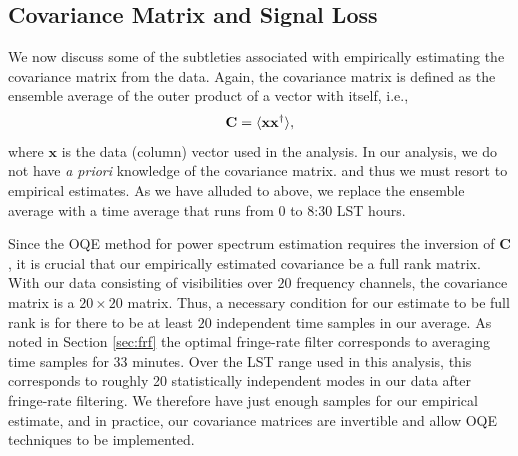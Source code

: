 \documentclass[twocolumn,numberedappendix]{emulateapj} \shorttitle{New Limits on the 21 cm Power Spectrum at $z=8.4$}
\newcommand{\x}{\mathbf{x}} \newcommand{\xhat}{\hat{\mathbf{x}}}
\newcommand{\C}{\mathbf{C}} \newcommand{\Q}{\mathbf{Q}}
\begin{document}
\subsection{Covariance Matrix and Signal Loss}
\label{sec:sigloss}
%

We now discuss some of the subtleties associated with empirically estimating the covariance matrix from
the data. Again, the covariance matrix is defined as the ensemble average of the outer
product of a vector with itself, i.e., 
\begin{equation}
    \C = \expval{\x\x^{\dagger}}, 
\end{equation}
where $\x$ is the data (column) vector used in the analysis. In our analysis,
we do not have \emph{a priori} knowledge of the covariance matrix. and thus we
must resort to empirical estimates. As we have alluded to above, we replace
the ensemble average with a time average that runs from 0 to 8:30 LST hours.

Since the OQE method for power spectrum estimation requires the inversion
of $\C$, it is crucial that our empirically estimated covariance be a full rank matrix.
With our data consisting of visibilities over $20$ frequency channels, the covariance
matrix is a $20 \times 20$ matrix. Thus, a necessary condition for our estimate to be
full rank is for there to be at least $20$ independent time samples in our average. As noted in Section \ref{sec:frf} the optimal fringe-rate
filter corresponds to averaging time samples for 33 minutes. Over the LST range
used in this analysis, this corresponds to roughly 20 statistically
independent modes in our data after fringe-rate filtering. We therefore have just enough
samples for our empirical estimate, and in practice, our covariance matrices are invertible
and allow OQE techniques to be implemented.
\end{document}
